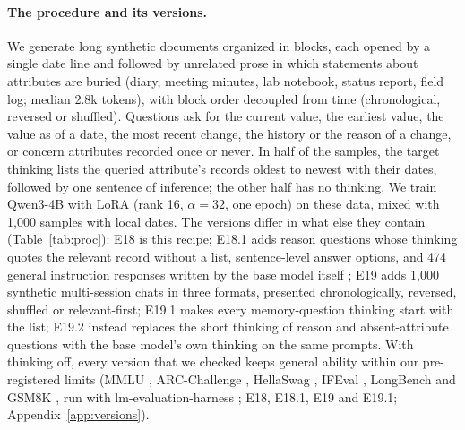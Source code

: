 \documentclass[11pt]{article}
\begin{document}
\paragraph{The procedure and its versions.}
We generate long synthetic documents organized in blocks, each opened by a single date line and followed by unrelated prose in which statements about attributes are buried (diary, meeting minutes, lab notebook, status report, field log; median 2.8k tokens), with block order decoupled from time (chronological, reversed or shuffled). Questions ask for the current value, the earliest value, the value as of a date, the most recent change, the history or the reason of a change, or concern attributes recorded once or never. In half of the samples, the target thinking lists the queried attribute's records oldest to newest with their dates, followed by one sentence of inference; the other half has no thinking. We train Qwen3-4B with LoRA (rank 16, $\alpha=32$, one epoch) on these data, mixed with 1{,}000 samples with local dates. The versions differ in what else they contain (Table~\ref{tab:proc}): E18 is this recipe; E18.1 adds reason questions whose thinking quotes the relevant record without a list, sentence-level answer options, and 474 general instruction responses written by the base model itself \citep[11.9\%; following][]{lambert2024tulu3,an2024film}; E19 adds 1{,}000 synthetic multi-session chats in three formats, presented chronologically, reversed, shuffled or relevant-first; E19.1 makes every memory-question thinking start with the list; E19.2 instead replaces the short thinking of reason and absent-attribute questions with the base model's own thinking on the same prompts. With thinking off, every version that we checked keeps general ability within our pre-registered limits (MMLU \citep{hendrycks2021mmlu}, ARC-Challenge \citep{clark2018arc}, HellaSwag \citep{zellers2019hellaswag}, IFEval \citep{zhou2023ifeval}, LongBench \citep{bai2024longbench} and GSM8K \citep{cobbe2021gsm8k}, run with lm-evaluation-harness \citep{biderman2024lmeval}; E18, E18.1, E19 and E19.1; Appendix~\ref{app:versions}).
\end{document}
